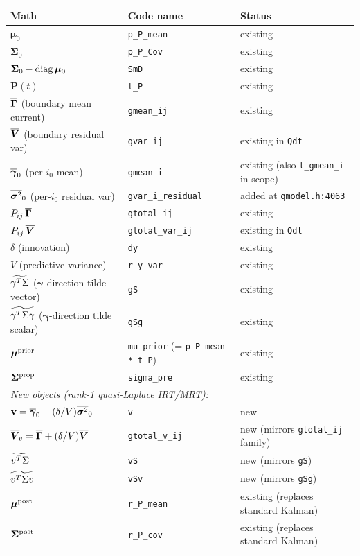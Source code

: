 \documentclass[11pt]{article}
\begin{document}
\begin{center}
\begin{tabular}{l l l}
\toprule
Math & Code name & Status \\
\midrule
$\boldsymbol{\mu}_0$ & \texttt{p\_P\_mean} & existing \\
$\boldsymbol{\Sigma}_0$ & \texttt{p\_P\_Cov} & existing \\
$\boldsymbol{\Sigma}_0 - \operatorname{diag}\boldsymbol{\mu}_0$ & \texttt{SmD} & existing \\
$\mathbf{P}(t)$ & \texttt{t\_P} & existing \\
$\overline{\boldsymbol{\Gamma}}$ (boundary mean current) & \texttt{gmean\_ij} & existing \\
$\overline{\boldsymbol{V}}$ (boundary residual var) & \texttt{gvar\_ij} & existing in \texttt{Qdt} \\
$\overline{\boldsymbol{\gamma}}_0$ (per-$i_0$ mean) & \texttt{gmean\_i} & existing (also \texttt{t\_gmean\_i} in scope) \\
$\overline{\boldsymbol{\sigma}^2}_0$ (per-$i_0$ residual var) & \texttt{gvar\_i\_residual} & added at \texttt{qmodel.h:4063} \\
$P_{ij}\,\overline{\boldsymbol{\Gamma}}$ & \texttt{gtotal\_ij} & existing \\
$P_{ij}\,\overline{\boldsymbol{V}}$ & \texttt{gtotal\_var\_ij} & existing in \texttt{Qdt} \\
$\delta$ (innovation) & \texttt{dy} & existing \\
$V$ (predictive variance) & \texttt{r\_y\_var} & existing \\
$\widetilde{\gamma^{T}\Sigma}$ (\(\boldsymbol{\gamma}\)-direction tilde vector) & \texttt{gS} & existing \\
$\widetilde{\gamma^{T}\Sigma\gamma}$ (\(\boldsymbol{\gamma}\)-direction tilde scalar) & \texttt{gSg} & existing \\
$\boldsymbol{\mu}^{\mathrm{prior}}$ & \texttt{mu\_prior} (= \texttt{p\_P\_mean * t\_P}) & existing \\
$\boldsymbol{\Sigma}^{\mathrm{prop}}$ & \texttt{sigma\_pre} & existing \\
\midrule
\multicolumn{3}{l}{\textit{New objects (rank-1 quasi-Laplace IRT/MRT):}}\\
$\mathbf{v} = \overline{\boldsymbol{\gamma}}_0 + (\delta/V)\overline{\boldsymbol{\sigma}^2}_0$ & \texttt{v} & new \\
$\overline{\boldsymbol{V}}_{\!v} = \overline{\boldsymbol{\Gamma}} + (\delta/V)\overline{\boldsymbol{V}}$ & \texttt{gtotal\_v\_ij} & new (mirrors \texttt{gtotal\_ij} family) \\
$\widetilde{v^{T}\Sigma}$ & \texttt{vS} & new (mirrors \texttt{gS}) \\
$\widetilde{v^{T}\Sigma v}$ & \texttt{vSv} & new (mirrors \texttt{gSg}) \\
$\boldsymbol{\mu}^{\mathrm{post}}$ & \texttt{r\_P\_mean} & existing (replaces standard Kalman) \\
$\boldsymbol{\Sigma}^{\mathrm{post}}$ & \texttt{r\_P\_cov} & existing (replaces standard Kalman) \\
\bottomrule
\end{tabular}
\end{center}
\end{document}
